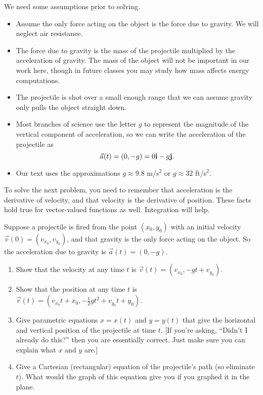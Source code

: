 We need some assumptions prior to solving. 
\begin{itemize}
 \item Assume the only force acting on the object is the force due to gravity. We will neglect air resistance. 
 \item The force due to gravity is the mass of the projectile multiplied by the acceleration of gravity. The mass of the object will not be important in our work here, though in future classes you may study how mass affects energy computations. 
 \item The projectile is shot over a small enough range that we can assume gravity only pulls the object straight down.
 \item Most branches of science use the letter $g$ to represent the magnitude of the vertical component of acceleration, so we can write the acceleration of the projectile as 
$$\vec a(t) = (0,-g) = 0{\bf i}-g{\bf j}.$$ 
 \item Our text uses the approximations $g\approx 9.8$ m/s$^2$ or $g\approx32$ ft/s$^2$. 
\end{itemize}

To solve the next problem, you need to remember that acceleration is the derivative of velocity, and that velocity is the derivative of position.  These facts hold true for vector-valued functions as well. Integration will help.

\begin{problem}
Suppose a projectile is fired from the point $(x_0,y_0)$ with an initial velocity $\vec v(0)=(v_{x_0},v_{y_0})$, and that gravity is the only force acting on the object. So the acceleration due to gravity is $\vec a(t) = (0,-g)$.
\begin{enumerate}
 \item Show that the velocity at any time $t$ is $\vec v(t) = (v_{x_0},-gt+v_{y_0})$.
 \item Show that the position at any time $t$ is $\vec r(t) = (v_{x_0}t+x_0,-\frac{1}{2}gt^2+v_{y_0}t+y_0)$. 
 \item Give parametric equations $x=x(t)$ and $y=y(t)$ that give the horizontal and vertical position of the projectile at time $t$. [If you're asking, ``Didn't I already do this?'' then you are essentially correct.  Just make sure you can explain what $x$ and $y$ are.] 
 \item Give a Cartesian (rectangular) equation of the projectile's path (so eliminate $t$).  What would the graph of this equation give you if you graphed it in the plane.
\end{enumerate}
\end{problem}

